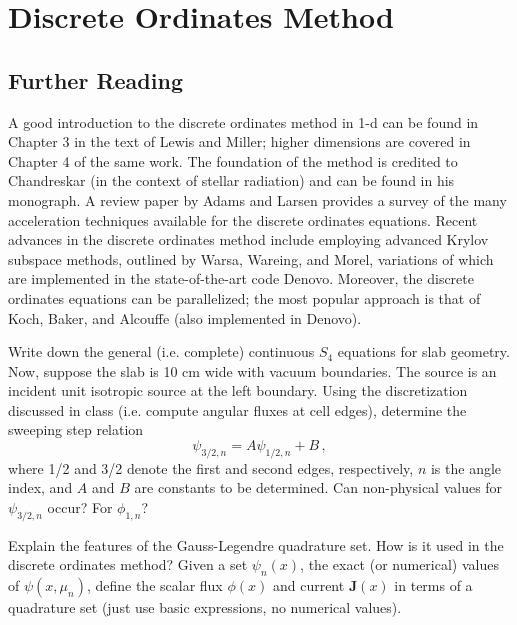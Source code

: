 
\chapter{Discrete Ordinates Method}
\label{lec:discreteordinates}

\section*{Further Reading}

A good introduction to the discrete ordinates method in 1-d can be found in Chapter 3 in the text of Lewis and Miller; higher dimensions are covered in Chapter 4 of the same work.  The foundation of the method is credited to Chandreskar (in the context of stellar radiation) and can be found in his monograph.  A review paper by Adams and Larsen provides a survey of the many acceleration techniques available for the discrete ordinates equations.  Recent advances in the discrete ordinates method include employing advanced Krylov subspace methods, outlined by Warsa, Wareing, and Morel, variations of which are implemented in the state-of-the-art code Denovo.  Moreover, the discrete ordinates equations can be parallelized; the most popular approach is that of Koch, Baker, and Alcouffe (also implemented in Denovo).

\begin{exercises}

  \item Write down the general (i.e. complete) continuous $S_4$ equations for slab geometry.  Now, suppose the slab is 10 cm wide with vacuum boundaries.  The source is an incident unit isotropic source at the left boundary.  Using the discretization discussed in class (i.e. compute angular fluxes at cell edges), determine the sweeping step relation
  \begin{equation*}
    \psi_{3/2,n} = A \psi_{1/2,n} + B \, ,
  \end{equation*}
  where 1/2 and 3/2 denote the first and second edges, respectively, $n$ is the angle index, and $A$ and $B$ are constants to be determined.  Can non-physical values for $\psi_{3/2,n}$ occur?  For $\phi_{1,n}$?

  \item Explain the features of the Gauss-Legendre quadrature set.  How is it used in the discrete ordinates method?  Given a set $\psi_n(x)$, the exact (or numerical) values of $\psi(x,\mu_n)$, define the scalar flux $\phi(x)$ and current $\mathbf{J}(x)$ in terms of a quadrature set (just use basic expressions, no numerical values).

\end{exercises}
